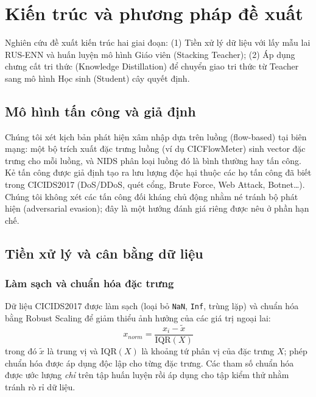 \section{Kiến trúc và phương pháp đề xuất}
Nghiên cứu đề xuất kiến trúc hai giai đoạn: (1) Tiền xử lý dữ liệu với lấy mẫu lai RUS-ENN và huấn luyện mô hình Giáo viên (Stacking Teacher); (2) Áp dụng chưng cất tri thức (Knowledge Distillation) để chuyển giao tri thức từ Teacher sang mô hình Học sinh (Student) cây quyết định.

\subsection{Mô hình tấn công và giả định}
Chúng tôi xét kịch bản phát hiện xâm nhập dựa trên luồng (flow-based) tại biên mạng: một bộ trích xuất đặc trưng luồng (ví dụ CICFlowMeter) sinh vector đặc trưng cho mỗi luồng, và NIDS phân loại luồng đó là bình thường hay tấn công. Kẻ tấn công được giả định tạo ra lưu lượng độc hại thuộc các họ tấn công đã biết trong CICIDS2017 (DoS/DDoS, quét cổng, Brute Force, Web Attack, Botnet\dots). Chúng tôi không xét các tấn công đối kháng chủ động nhằm né tránh bộ phát hiện (adversarial evasion); đây là một hướng đánh giá riêng được nêu ở phần hạn chế.

\subsection{Tiền xử lý và cân bằng dữ liệu}
\subsubsection{Làm sạch và chuẩn hóa đặc trưng} 
Dữ liệu CICIDS2017 được làm sạch (loại bỏ \texttt{NaN}, \texttt{Inf}, trùng lặp) và chuẩn hóa bằng Robust Scaling để giảm thiểu ảnh hưởng của các giá trị ngoại lai:
\begin{equation}
x_{norm} = \frac{x_i - \tilde{x}}{\text{IQR}(X)}
\end{equation}
trong đó $\tilde{x}$ là trung vị và $\text{IQR}(X)$ là khoảng tứ phân vị của đặc trưng $X$; phép chuẩn hóa được áp dụng độc lập cho từng đặc trưng. Các tham số chuẩn hóa được ước lượng \emph{chỉ} trên tập huấn luyện rồi áp dụng cho tập kiểm thử nhằm tránh rò rỉ dữ liệu.

